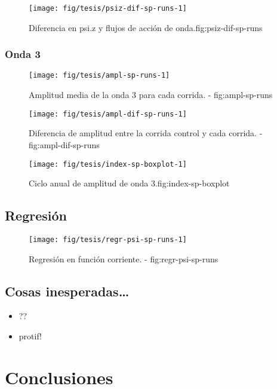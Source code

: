 \documentclass[spanish,a4paper]{book}
\providecommand{\tightlist}{%
  \setlength{\itemsep}{0pt}\setlength{\parskip}{0pt}}
\begin{document}
\begin{figure}
\texttt{[image: fig/tesis/psiz-dif-sp-runs-1]} \caption{Diferencia en psi.z y flujos de acción de onda.{fig:psiz-dif-sp-runs}}\label{fig:psiz-dif-sp-runs}
\end{figure}

\subsection{Onda 3}\label{onda-3-2}

\begin{figure}
\texttt{[image: fig/tesis/ampl-sp-runs-1]} \caption{Amplitud media de la onda 3 para cada corrida. - fig:ampl-sp-runs}\label{fig:ampl-sp-runs}
\end{figure}

\begin{figure}
\texttt{[image: fig/tesis/ampl-dif-sp-runs-1]} \caption{Diferencia de amplitud entre la corrida control y cada corrida. - fig:ampl-dif-sp-runs}\label{fig:ampl-dif-sp-runs}
\end{figure}

\begin{figure}
\texttt{[image: fig/tesis/index-sp-boxplot-1]} \caption{Ciclo anual de amplitud de onda 3.{fig:index-sp-boxplot}}\label{fig:index-sp-boxplot}
\end{figure}

\section{Regresión}\label{regresion}

\begin{figure}
\texttt{[image: fig/tesis/regr-psi-sp-runs-1]} \caption{Regresión en función corriente. - fig:regr-psi-sp-runs}\label{fig:regr-psi-sp-runs}
\end{figure}

\section{Cosas inesperadas\ldots{}}\label{cosas-inesperadas}

\begin{itemize}
\tightlist
\item
  ??
\item
  protif!
\end{itemize}

\chapter{Conclusiones}\label{conclusiones}
\end{document}
